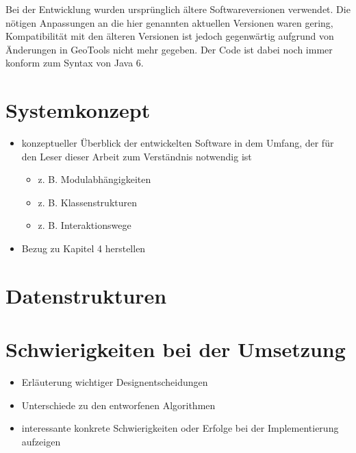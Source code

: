 \documentclass[../main/thesis.tex]{subfiles}
\begin{document}
Bei der Entwicklung wurden ursprünglich ältere Softwareversionen verwendet.
Die nötigen Anpassungen an die hier genannten aktuellen Versionen waren gering, Kompatibilität mit den älteren Versionen ist jedoch gegenwärtig aufgrund von Änderungen in GeoTools nicht mehr gegeben.
Der Code ist dabei noch immer konform zum Syntax von Java 6. 



\section{Systemkonzept}

\begin{itemize}
	\item konzeptueller Überblick der entwickelten Software in dem Umfang, der für den Leser dieser Arbeit zum Verständnis notwendig ist
	\begin{itemize}
		\item z. B. Modulabhängigkeiten
		\item z. B. Klassenstrukturen
		\item z. B. Interaktionswege
	\end{itemize}
	\item Bezug zu Kapitel 4 herstellen
\end{itemize}



\section{Datenstrukturen}
\label{ch:data-structures}



\section{Schwierigkeiten bei der Umsetzung}
\label{ch:impl-difficulties}

\begin{itemize}
	\item Erläuterung wichtiger Designentscheidungen
	\item Unterschiede zu den entworfenen Algorithmen
	\item interessante konkrete Schwierigkeiten oder Erfolge bei der Implementierung aufzeigen
\end{itemize}


\end{document}
